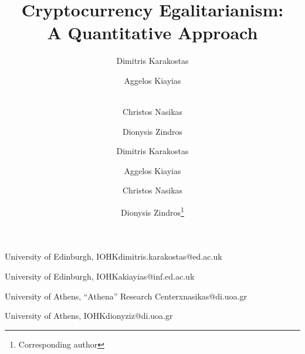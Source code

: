 
\title{Cryptocurrency Egalitarianism:\protect\\A Quantitative Approach}

\iflncs
  \author{
         Dimitris Karakostas  \and
         Aggelos Kiayias  \and\\
         Christos Nasikas  \and
         Dionysis Zindros 
  }
\else

  \author{Dimitris Karakostas}{University of Edinburgh, IOHK}{dimitris.karakostas@ed.ac.uk}{}{}

  \author{Aggelos Kiayias}{University of Edinburgh, IOHK}{akiayias@inf.ed.ac.uk}{}{}
  \author{Christos Nasikas}{University of Athens, ``Athena'' Research Center}{xnasikas@di.uoa.gr}{}{}
  \author{Dionysis Zindros\footnote{Corresponding author}}{University of Athens, IOHK}{dionyziz@di.uoa.gr}{}{}

\fi
\maketitle
